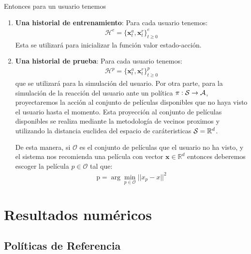 Entonces para un usuario tenemos 
\begin{enumerate}
    \item \textbf{Una historial de entrenamiento}: Para cada usuario tenemos:
    \begin{gather}
        \mathcal{H}^e = \{ \bm{x}^a_t,\bm{x}^r_t\}_{t \geq 0}^e
    \end{gather} 
    Esta se utilizará para inicializar la función valor estado-acción.
    \item  \textbf{Una historial de prueba}: Para cada usuario tenemos:
    \begin{gather}
        \mathcal{H}^p =  \{ \bm{x}^a_t,\bm{x}^r_t\}_{t \geq 0}^p
    \end{gather}
    que se utilizará para la simulación del usuario. Por otra parte, para la simulación de la reacción del usuario ante  un política $\pi: \mathcal{S} \rightarrow \mathcal{A} $, proyectaremos la acción al conjunto de películas disponibles que no haya visto el usuario hasta el momento. Esta proyección al conjunto de películas disponibles se realiza mediante la metodología de vecinos proximos y utilizando la distancia euclidea del espacio de caráteristicas $\mathcal{S} = \mathbb{R}^d$. 

    De esta manera, si $\mathcal{O}$ es el conjunto de películas que el usuario no ha visto, y el sistema nos recomienda una película con vector $\bm{x} \in \mathbb{R}^d$ entonces deberemos escoger la película $p \in \mathcal{O}$ tal que:
    \begin{gather}
        \text{p} = \arg \min_{p \in \mathcal{O}} || x_p - x ||^2
    \end{gather}
    
\end{enumerate}




\section{Resultados numéricos}

\subsection{Políticas de Referencia}


